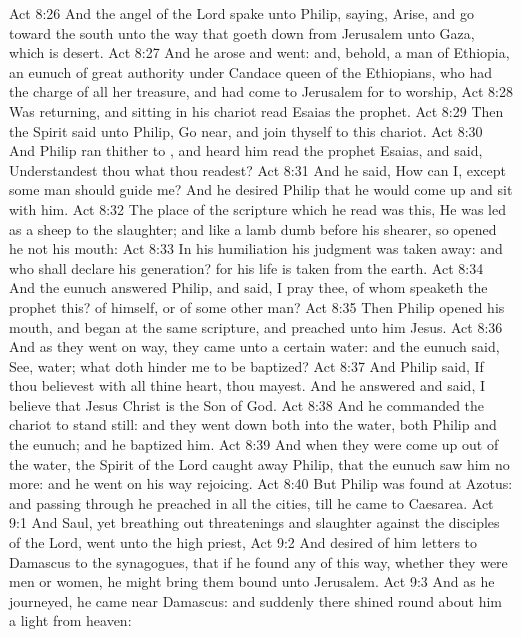 \vs Act 8:26 And the angel of the Lord spake unto Philip, saying, Arise, and go toward the south unto the way that goeth down from Jerusalem unto Gaza, which is desert.
\vs Act 8:27 And he arose and went: and, behold, a man of Ethiopia, an eunuch of great authority under Candace queen of the Ethiopians, who had the charge of all her treasure, and had come to Jerusalem for to worship,
\vs Act 8:28 Was returning, and sitting in his chariot read Esaias the prophet.
\vs Act 8:29 Then the Spirit said unto Philip, Go near, and join thyself to this chariot.
\vs Act 8:30 And Philip ran thither to , and heard him read the prophet Esaias, and said, Understandest thou what thou readest?
\vs Act 8:31 And he said, How can I, except some man should guide me? And he desired Philip that he would come up and sit with him.
\vs Act 8:32 The place of the scripture which he read was this, He was led as a sheep to the slaughter; and like a lamb dumb before his shearer, so opened he not his mouth:
\vs Act 8:33 In his humiliation his judgment was taken away: and who shall declare his generation? for his life is taken from the earth.
\vs Act 8:34 And the eunuch answered Philip, and said, I pray thee, of whom speaketh the prophet this? of himself, or of some other man?
\vs Act 8:35 Then Philip opened his mouth, and began at the same scripture, and preached unto him Jesus.
\vs Act 8:36 And as they went on  way, they came unto a certain water: and the eunuch said, See,  water; what doth hinder me to be baptized?
\vs Act 8:37 And Philip said, If thou believest with all thine heart, thou mayest. And he answered and said, I believe that Jesus Christ is the Son of God.
\vs Act 8:38 And he commanded the chariot to stand still: and they went down both into the water, both Philip and the eunuch; and he baptized him.
\vs Act 8:39 And when they were come up out of the water, the Spirit of the Lord caught away Philip, that the eunuch saw him no more: and he went on his way rejoicing.
\vs Act 8:40 But Philip was found at Azotus: and passing through he preached in all the cities, till he came to Caesarea.
\vs Act 9:1 And Saul, yet breathing out threatenings and slaughter against the disciples of the Lord, went unto the high priest,
\vs Act 9:2 And desired of him letters to Damascus to the synagogues, that if he found any of this way, whether they were men or women, he might bring them bound unto Jerusalem.
\vs Act 9:3 And as he journeyed, he came near Damascus: and suddenly there shined round about him a light from heaven:
